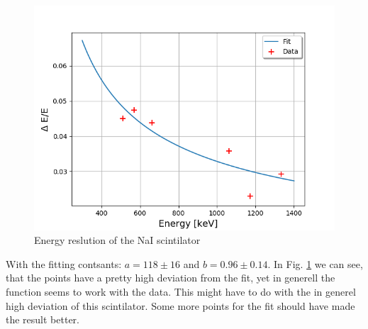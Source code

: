 \begin{figure}[h]
  \includegraphics[width=\linewidth]{../plots/szin_res.png}
  \caption{Energy reslution of the NaI scintilator}
  \label{szin_res}
\end{figure}
With the fitting contsants: $a = 118 \pm 16$ and $b = 0.96 \pm 0.14$.
In Fig. \ref{szin_res} we can see, that the points have a pretty high deviation from the fit, yet in generell the function seems to work with the data.
This might have to do with the in generel high deviation of this scintilator.
Some more points for the fit should have made the result better.

\clearpage
